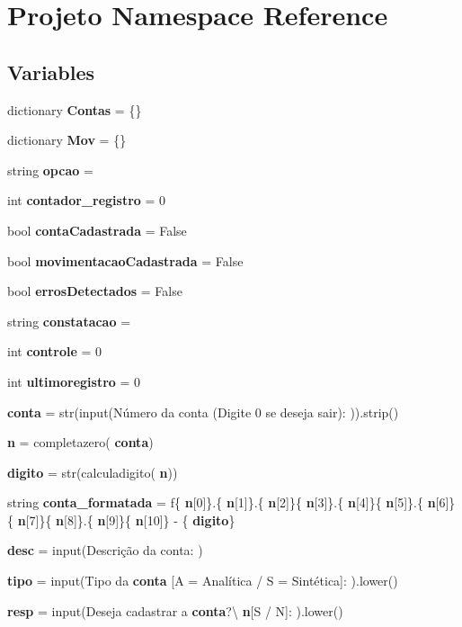\section{Projeto Namespace Reference}
\label{namespace_projeto}
\subsection*{Variables}
\begin{DoxyCompactItemize}
\item 
dictionary \textbf{ Contas} = \{\}
\item 
dictionary \textbf{ Mov} = \{\}
\item 
string \textbf{ opcao} = \textquotesingle{}\textquotesingle{}
\item 
int \textbf{ contador\+\_\+registro} = 0
\item 
bool \textbf{ conta\+Cadastrada} = False
\item 
bool \textbf{ movimentacao\+Cadastrada} = False
\item 
bool \textbf{ erros\+Detectados} = False
\item 
string \textbf{ constatacao} = \textquotesingle{}\textquotesingle{}
\item 
int \textbf{ controle} = 0
\item 
int \textbf{ ultimoregistro} = 0
\item 
\textbf{ conta} = str(input(\textquotesingle{}Número da conta (Digite 0 se deseja sair)\+: \textquotesingle{})).strip()
\item 
\textbf{ n} = completazero(\textbf{ conta})
\item 
\textbf{ digito} = str(calculadigito(\textbf{ n}))
\item 
string \textbf{ conta\+\_\+formatada} = f\textquotesingle{}\{\textbf{ n}[0]\}.\{\textbf{ n}[1]\}.\{\textbf{ n}[2]\}\{\textbf{ n}[3]\}.\{\textbf{ n}[4]\}\{\textbf{ n}[5]\}.\{\textbf{ n}[6]\}\{\textbf{ n}[7]\}\{\textbf{ n}[8]\}.\{\textbf{ n}[9]\}\{\textbf{ n}[10]\} -\/ \{\textbf{ digito}\}\textquotesingle{}
\item 
\textbf{ desc} = input(\textquotesingle{}Descrição da conta\+: \textquotesingle{})
\item 
\textbf{ tipo} = input(\textquotesingle{}Tipo da \textbf{ conta} [A = Analítica / S = Sintética]\+: \textquotesingle{}).lower()
\item 
\textbf{ resp} = input(\textquotesingle{}Deseja cadastrar a \textbf{ conta}?\textbackslash{}\textbf{ n}[S / N]\+: \textquotesingle{}).lower()

\end{DoxyCompactItemize}
